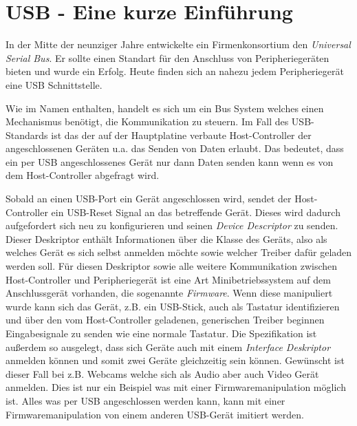 \section{USB - Eine kurze Einführung}
In der Mitte der neunziger Jahre entwickelte ein Firmenkonsortium den \textit{Universal Serial Bus}.
Er sollte einen Standart für den Anschluss von Peripheriegeräten bieten und wurde ein Erfolg.
Heute finden sich an nahezu jedem Peripheriegerät eine USB Schnittstelle.

Wie im Namen enthalten, handelt es sich um ein Bus System welches einen Mechanismus benötigt, die Kommunikation zu steuern.
Im Fall des USB-Standards ist das der auf der Hauptplatine verbaute Host-Controller der angeschlossenen Geräten u.a. das Senden von Daten erlaubt.
Das bedeutet, dass ein per USB angeschlossenes Gerät nur dann Daten senden kann wenn es von dem Host-Controller abgefragt wird.

Sobald an einen USB-Port ein Gerät angeschlossen wird, sendet der Host-Controller ein USB-Reset Signal an das betreffende Gerät.
Dieses wird dadurch aufgefordert sich neu zu konfigurieren und seinen \textit{Device Descriptor} zu senden.
Dieser Deskriptor enthält Informationen über die Klasse des Geräts, also als welches Gerät es sich selbst anmelden möchte sowie welcher Treiber dafür geladen werden soll.
Für diesen Deskriptor sowie alle weitere Kommunikation zwischen Host-Controller und Peripheriegerät ist eine Art Minibetriebssystem auf dem Anschlussgerät vorhanden, die sogenannte \textit{Firmware}.
Wenn diese manipuliert wurde kann sich das Gerät, z.B. ein USB-Stick, auch als Tastatur identifizieren und über den vom Host-Controller geladenen, generischen Treiber beginnen Eingabesignale zu senden wie eine normale Tastatur.
Die Spezifikation ist außerdem so ausgelegt, dass sich Geräte auch mit einem \textit{Interface Deskriptor} anmelden können und somit zwei Geräte gleichzeitig sein können.
Gewünscht ist dieser Fall bei z.B. Webcams welche sich als Audio aber auch Video Gerät anmelden.
Dies ist nur ein Beispiel was mit einer Firmwaremanipulation möglich ist.
Alles was per USB angeschlossen werden kann, kann mit einer Firmwaremanipulation von einem anderen USB-Gerät imitiert werden.
